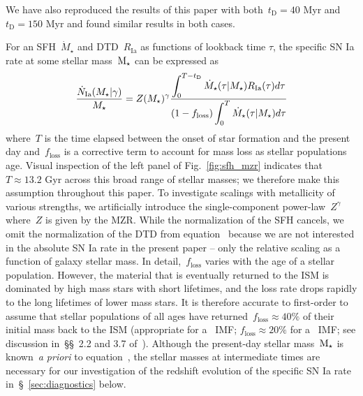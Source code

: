 \documentclass[ms.tex]{subfiles}
\begin{document}
We have also reproduced the results of this paper with both~$t_\text{D} = 40$
Myr and~$t_\text{D} = 150$ Myr and found similar results in both cases.
\par
For an SFH~$\dot{M}_\star$ and DTD~$R_\text{Ia}$ as functions of lookback time
$\tau$, the specific SN Ia rate at some stellar mass~$\text{M}_\star$ can be expressed
as
\begin{equation}
\frac{\dot{N}_\text{Ia}(M_\star | \gamma)}{M_\star} = Z(M_\star)^\gamma
\frac{\displaystyle{
	\int_0^{T - t_\text{D}}\dot{M}_\star(\tau | M_\star) R_\text{Ia}(\tau) d\tau
}}{\displaystyle{
	(1 - f_\text{loss})\int_0^T \dot{M}_\star(\tau | M_\star) d\tau
}}
\label{eq:specia}
\end{equation}
where~$T$ is the time elapsed between the onset of star formation and the
present day and~$f_\text{loss}$ is a corrective term to account for mass loss
as stellar populations age.
Visual inspection of the left panel of Fig.~\ref{fig:sfh_mzr} indicates that
$T \approx 13.2$ Gyr across this broad range of stellar masses; we therefore
make this assumption throughout this paper.
To investigate scalings with metallicity of various strengths, we artificially
introduce the single-component power-law~$Z^\gamma$ where~$Z$ is given by the
MZR.
While the normalization of the SFH cancels, we omit the normalization of the
DTD from equation~ because we are not interested in the
absolute SN Ia rate in the present paper -- only the relative scaling as a
function of galaxy stellar mass.
In detail,~$f_\text{loss}$ varies with the age of a stellar population.
However, the material that is eventually returned to the ISM is dominated by
high mass stars with short lifetimes, and the loss rate drops rapidly to the
long lifetimes of lower mass stars.
It is therefore accurate to first-order to assume that stellar populations of
all ages have returned~$f_\text{loss} \approx 40\%$ of their initial mass back
to the ISM (appropriate for a~\citealt{Kroupa2001} IMF;
$f_\text{loss} \approx 20\%$ for a~\citealt{Salpeter1955} IMF; see discussion
in~\S\S~2.2 and 3.7 of~\citealt*{Weinberg2017}).
Although the present-day stellar mass~$\text{M}_\star$ is known~\textit{a priori} to
equation~, the stellar masses at intermediate times are
necessary for our investigation of the redshift evolution of the specific SN Ia
rate in~\S~\ref{sec:diagnostics} below.
\end{document}
